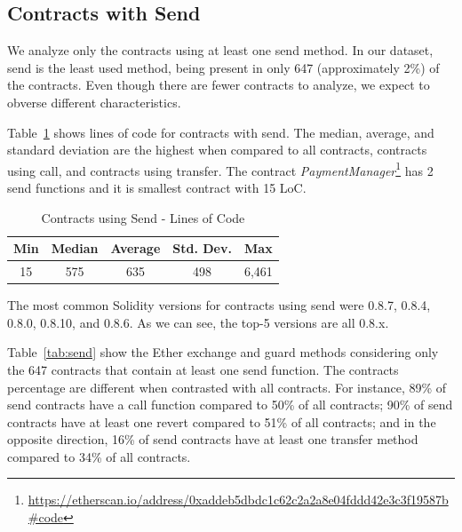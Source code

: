 \documentclass[10pt,conference]{IEEEtran}
\begin{document}
\subsection{Contracts with Send}

We analyze only the contracts using at least one send method. In our dataset, send is the least used method, being present in only 647 (approximately 2\%) of the contracts. Even though there are fewer contracts to analyze, we expect to obverse different characteristics.

Table~\ref{tab:send-loc} shows lines of code for contracts with send. The median, average, and standard deviation are the highest when compared to all contracts, contracts using call, and contracts using transfer. 
The contract \textit{PaymentManager}\footnote{\url{https://etherscan.io/address/0xaddeb5dbdc1c62c2a2a8e04fddd42e3c3f19587b\#code}} has 2 send functions and it is smallest contract with 15 LoC.

\begin{table}
\center
  \caption{Contracts using Send - Lines of Code}
  \label{tab:send-loc}
  \begin{tabular}{c c c c c}
    \hline
    Min & Median & Average & Std. Dev. & Max \\
    \hline
   15 & 575 & 635 & 498 & 6,461 \\
  \hline
\end{tabular}
\end{table}

The most common Solidity versions for contracts using send were 0.8.7,  0.8.4,  0.8.0,  0.8.10,  and 0.8.6. As we can see,  the top-5 versions are all 0.8.x. 


Table~\ref{tab:send} show the Ether exchange and guard methods considering only the 647 contracts that contain at least one send function. The contracts percentage are different when contrasted with all contracts. For instance, 89\% of send contracts have a call function compared to 50\% of all contracts; 90\% of send contracts have at least one revert compared to 51\% of all contracts; and in the opposite direction, 16\% of send contracts have at least one transfer method compared to 34\% of all contracts.
\end{document}
